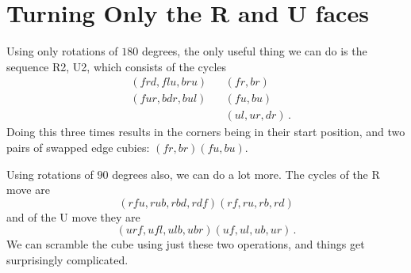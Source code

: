 \section{Turning Only the \rr R and \rr U faces}
Using only rotations of $180$ degrees, the only useful thing we can do is the sequence \rr R2, \rr U2, which consists of the cycles
\begin{align*}
    &(frd, flu, bru) &&(fr, br)\\
    &(fur, bdr, bul) &&(fu, bu)\\
    & &&(ul, ur, dr)\,.
\end{align*}
Doing this three times results in the corners being in their start position, and two pairs of swapped edge cubies: $(fr, br) (fu, bu)$.

Using rotations of $90$ degrees also, we can do a lot more.
The cycles of the \rr R move are
\[
    (rfu, rub, rbd, rdf)(rf, ru, rb, rd)
\] and of the \rr U move they are
\[
    (urf, ufl, ulb, ubr)(uf, ul, ub, ur)\,.
\]
We can scramble the cube using just these two operations, and things get surprisingly complicated.

